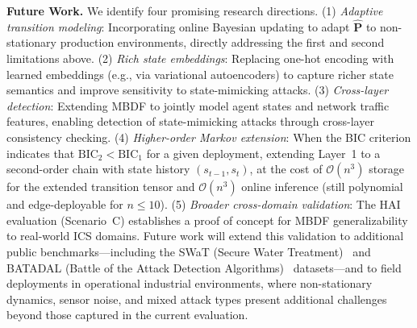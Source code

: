 \documentclass[manuscript,screen,review]{acmart}
\begin{document}
\textbf{Future Work.}
We identify four promising research directions.
(1) \textit{Adaptive transition modeling}: Incorporating
online Bayesian updating to adapt $\hat{\mathbf{P}}$
to non-stationary production environments, directly
addressing the first and second limitations above.
(2) \textit{Rich state embeddings}: Replacing one-hot
encoding with learned embeddings (e.g., via variational
autoencoders) to capture richer state semantics and
improve sensitivity to state-mimicking attacks.
(3) \textit{Cross-layer detection}: Extending MBDF
to jointly model agent states and network traffic
features, enabling detection of state-mimicking attacks
through cross-layer consistency checking.
(4) \textit{Higher-order Markov extension}: When the BIC
criterion indicates that $\mathrm{BIC}_2 < \mathrm{BIC}_1$
for a given deployment, extending Layer~1 to a
second-order chain with state history
$(s_{t-1}, s_t)$, at the cost of
$\mathcal{O}(n^3)$ storage for the extended transition
tensor and $\mathcal{O}(n^3)$ online inference
(still polynomial and edge-deployable for $n \leq 10$).
(5) \textit{Broader cross-domain validation}: The HAI
evaluation (Scenario~C) establishes a proof of concept
for MBDF generalizability to real-world ICS domains.
Future work will extend this validation to additional
public benchmarks---including the SWaT (Secure Water
Treatment)~\cite{ref_swat} and BATADAL (Battle of the
Attack Detection Algorithms)~\cite{ref_batadal}
datasets---and to field deployments in operational
industrial environments, where non-stationary dynamics,
sensor noise, and mixed attack types present additional
challenges beyond those captured in the current
evaluation.



\end{document}
